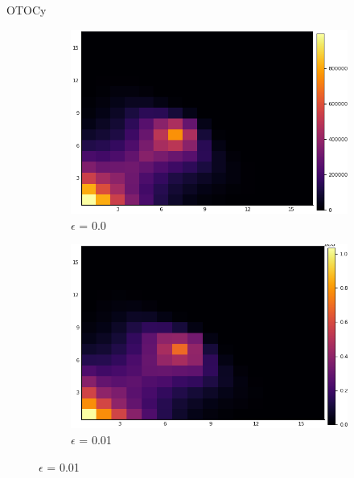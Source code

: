 \documentclass{article}
\begin{document}
\begin{section}{OTOCy}
                                \begin{figure}[H]
                                    \begin{subfigure}{.33\textwidth}
                                      \centering
                                      \includegraphics[width=1.0\linewidth]{nW0.png}
                                      \caption{$\epsilon$ = 0.0}
                                     
                                    \end{subfigure}%
                                    \begin{subfigure}{.33\textwidth}
                                      \centering
                                      \includegraphics[width=1.0\linewidth]{nW0.01.png}
                                      \caption{$\epsilon$ = 0.01}
        

\end{subfigure}
\end{figure}
\end{section}
\end{document}
